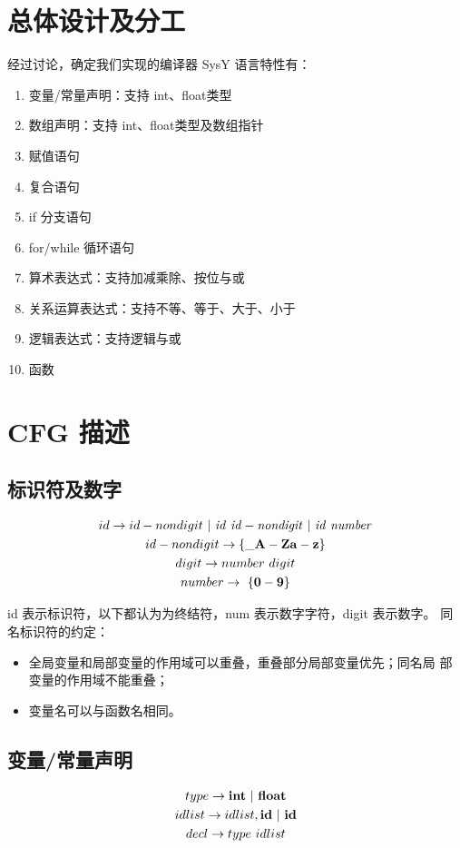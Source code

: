 \documentclass[UTF8,a4paper,10pt]{ctexart}
\begin{document}
\section{总体设计及分工}
经过讨论，确定我们实现的编译器 SysY 语言特性有：
\begin{enumerate}
  \item 变量/常量声明：支持 int、float类型
  \item 数组声明：支持 int、float类型及数组指针
  \item 赋值语句
  \item 复合语句
  \item if 分支语句
  \item for/while 循环语句
  \item 算术表达式：支持加减乘除、按位与或
  \item 关系运算表达式：支持不等、等于、大于、小于
  \item 逻辑表达式：支持逻辑与或
  \item 函数
\end{enumerate}
\section{CFG 描述}
\subsection{标识符及数字}
\begin{gather*}
  id \rightarrow id-nondigit\ |\ \it{id}\ id-nondigit\  |\ \it{id}\ number\\
  id-nondigit \rightarrow \rm\bf{\{\_A-Za-z\}}\\
  digit \rightarrow number\ digit\\
  number \rightarrow\ \rm\bf{\{0-9\}}\\
\end{gather*}

id 表示标识符，以下都认为为终结符，num 表示数字字符，digit 表示数字。
同名标识符的约定：
\begin{itemize}
  \item 全局变量和局部变量的作用域可以重叠，重叠部分局部变量优先；同名局
        部变量的作用域不能重叠；
  \item 变量名可以与函数名相同。
\end{itemize}

\subsection{变量/常量声明}
\begin{gather*}
  type \rightarrow \rm\bf{int\ |\ float}\\
  idlist \rightarrow idlist, \rm\bf{id\ |\ id}\\
  decl \rightarrow type\ idlist
\end{gather*}
\end{document}
